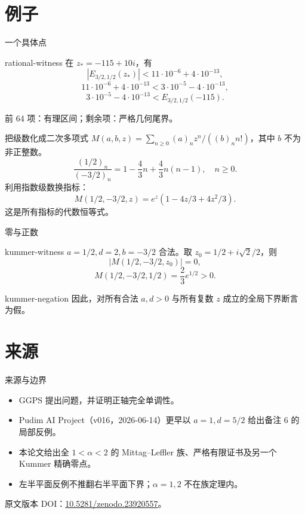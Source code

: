 \documentclass{beamer}
\begin{document}
\section{例子}
\begin{frame}{一个具体点}
\begin{bookresult}{rational-witness}
在 $z_*=-115+10i$，有
\[
|E_{3/2,1/2}(z_*)|{<} 11\cdot10^{-6}+4\cdot10^{-13},
\]
\[
11\cdot10^{-6}+4\cdot10^{-13}{<} 3\cdot10^{-5}-4\cdot10^{-13},
\]
\[
3\cdot10^{-5}-4\cdot10^{-13}{<} E_{3/2,1/2}(-115).
\]
\end{bookresult}
前 64 项：有理区间；剩余项：严格几何尾界。
\end{frame}
\begin{frame}{把级数化成二次多项式}
$M(a,b,z)=\sum_{n\ge0}(a)_n z^n/((b)_n n!)$，其中 $b$ 不为非正整数。
\[
\frac{(1/2)_n}{(-3/2)_n}=1-\frac43n+\frac43n(n-1),\quad n\ge0.
\]
利用指数级数换指标：
\[
M(1/2,-3/2,z)=e^z(1-4z/3+4z^2/3).
\]
这是所有指标的代数恒等式。
\end{frame}
\begin{frame}{零与正数}
\begin{bookresult}{kummer-witness}
$a=1/2,d=2,b=-3/2$ 合法。取 $z_0=1/2+i\sqrt2/2$，则
\[
|M(1/2,-3/2,z_0)|=0,
\]
\[
M(1/2,-3/2,1/2)=\frac23e^{1/2}>0.
\]
\end{bookresult}
\begin{bookresult}{kummer-negation}
因此，对所有合法 $a,d>0$ 与所有复数 $z$ 成立的全局下界断言为假。
\end{bookresult}
\end{frame}
\section{来源}
\begin{frame}{来源与边界}
\begin{itemize}
\item GGPS 提出问题，并证明正轴完全单调性。
\item Pudim AI Project（v016，2026-06-14）更早以 $a=1,d=5/2$ 给出备注 6 的局部反例。
\item 本论文给出全 $1{<} \alpha{<} 2$ 的 Mittag--Leffler 族、严格有限证书及另一个 Kummer 精确零点。
\item 左半平面反例不推翻右半平面下界；$\alpha=1,2$ 不在族定理内。
\end{itemize}
\small 原文版本 DOI：\href{https://doi.org/10.5281/zenodo.23920557}{10.5281/zenodo.23920557}。
\end{frame}
\appendix
\end{document}
